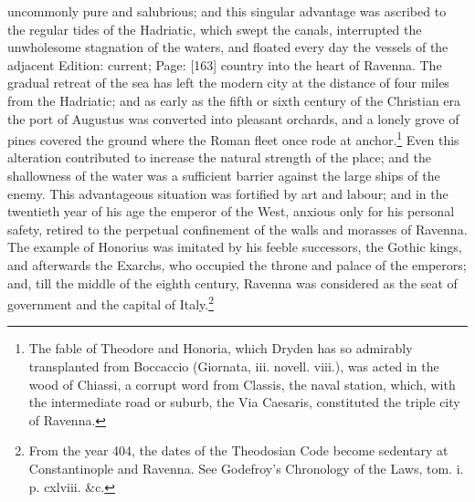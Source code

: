 uncommonly pure and salubrious; and this singular advantage was ascribed to the regular tides of the Hadriatic, which swept the canals, interrupted the unwholesome stagnation of the waters, and floated every day the vessels of the adjacent Edition: current; Page: [163] country into the heart of Ravenna. The gradual retreat of the sea has left the modern city at the distance of four miles from the Hadriatic; and as early as the fifth or sixth century of the Christian era the port of Augustus was converted into pleasant orchards, and a lonely grove of pines covered the ground where the Roman fleet once rode at anchor.\footnote{The fable of Theodore and Honoria, which Dryden has so admirably transplanted from Boccaccio (Giornata, iii. novell. viii.), was acted in the wood of Chiassi, a corrupt word from Classis, the naval station, which, with the intermediate road or suburb, the Via Caesaris, constituted the triple city of Ravenna.} Even this alteration contributed to increase the natural strength of the place; and the shallowness of the water was a sufficient barrier against the large ships of the enemy. This advantageous situation was fortified by art and labour; and in the twentieth year of his age the emperor of the West, anxious only for his personal safety, retired to the perpetual confinement of the walls and morasses of Ravenna. The example of Honorius was imitated by his feeble successors, the Gothic kings, and afterwards the Exarchs, who occupied the throne and palace of the emperors; and, till the middle of the eighth century, Ravenna was considered as the seat of government and the capital of Italy.\footnote{From the year 404, the dates of the Theodosian Code become sedentary at Constantinople and Ravenna. See Godefroy\texthebrew{}’s Chronology of the Laws, tom. i. p. cxlviii. \&c.}

